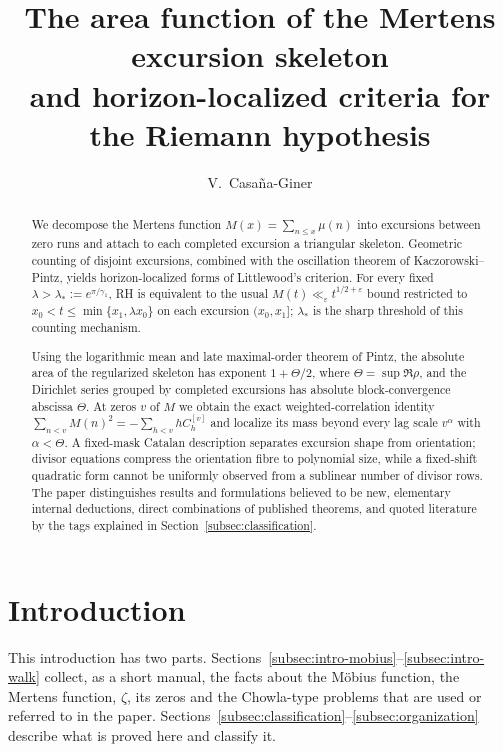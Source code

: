 \documentclass[11pt]{amsart}
\title[The Mertens excursion skeleton]{The area function of the Mertens excursion skeleton\\
and horizon-localized criteria for the Riemann hypothesis}
\author{V.~Casa\~na-Giner}
\date{}
\numberwithin{equation}{section}
\theoremstyle{plain}
\theoremstyle{definition}
\theoremstyle{remark}
\newcommand{\eps}{\varepsilon}
\begin{document}
\begin{abstract}
We decompose the Mertens function $M(x)=\sum_{n\le x}\mu(n)$ into excursions
between zero runs and attach to each completed excursion a triangular
skeleton.  Geometric counting of disjoint excursions, combined with the
oscillation theorem of Kaczorowski--Pintz, yields horizon-localized forms of
Littlewood's criterion.  For every fixed
$\lambda>\lambda_*:=e^{\pi/\gamma_1}$, RH is equivalent to the usual
$M(t)\ll_\eps t^{1/2+\eps}$ bound restricted to
$x_0<t\le\min\{x_1,\lambda x_0\}$ on each excursion $(x_0,x_1]$;
$\lambda_*$ is the sharp threshold of this counting mechanism.

Using the logarithmic mean and late maximal-order theorem of Pintz, the
absolute area of the regularized skeleton has exponent
$1+\Theta/2$, where $\Theta=\sup\Re\rho$, and the Dirichlet series grouped by
completed excursions has absolute block-convergence abscissa $\Theta$.
At zeros $v$ of $M$ we obtain the exact weighted-correlation identity
$\sum_{n<v}M(n)^2=-\sum_{h<v}hC_h^{[v]}$ and localize its mass beyond every
lag scale $v^\alpha$ with $\alpha<\Theta$.  A fixed-mask Catalan description
separates excursion shape from orientation; divisor equations compress the
orientation fibre to polynomial size, while a fixed-shift quadratic form
cannot be uniformly observed from a sublinear number of divisor rows.  The
paper distinguishes results and formulations believed to be new, elementary
internal deductions, direct combinations of published theorems, and quoted
literature by the tags explained in Section~\ref{subsec:classification}.
\end{abstract}

\maketitle

\tableofcontents

\section{Introduction}
\label{sec:introduction}

This introduction has two parts. Sections~\ref{subsec:intro-mobius}--\ref{subsec:intro-walk}
collect, as a short manual, the facts about the Möbius function, the Mertens
function, $\zeta$, its zeros and the Chowla-type problems that are used or
referred to in the paper. Sections~\ref{subsec:classification}--\ref{subsec:organization}
describe what is proved here and classify it.
\end{document}
